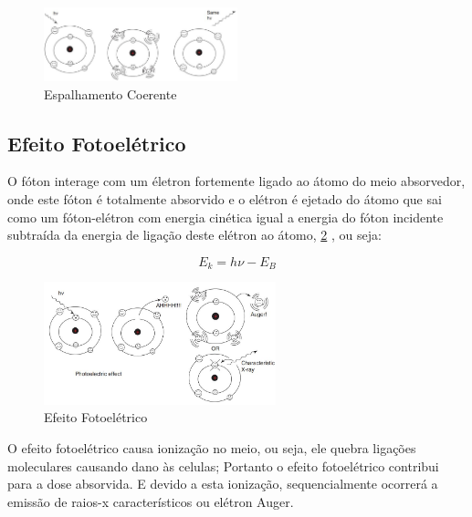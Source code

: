 \documentclass[11pt,a4paper]{article}
\begin{document}
            \begin{figure}[h]
                \centering
                \includegraphics[width=0.5\textwidth]{Imagens/espalhamentoCoerente.JPG}
                \caption{Espalhamento Coerente}
                \label{fig:espalhamentoCoerente}
            \end{figure}

\subsection*{Efeito Fotoelétrico}

    O fóton interage com um életron fortemente ligado ao átomo do meio absorvedor, onde este fóton é totalmente absorvido e o elétron é ejetado do átomo que sai como um fóton-elétron com energia cinética igual a energia do fóton incidente subtraída da energia de ligação deste elétron ao átomo, \ref{fig:efeitoFotoeletrico} , ou seja:



                \begin{equation}
                    E_k = h\nu - E_B
                \end{equation}

                \begin{figure}[h]
                    \centering
                    \includegraphics[width=0.6\textwidth]{Imagens/efeitoFotoeletrico.JPG}
                    \caption{Efeito Fotoelétrico}
                    \label{fig:efeitoFotoeletrico}
                \end{figure}

    O efeito fotoelétrico causa ionização no meio, ou seja, ele quebra ligações moleculares causando dano às celulas; Portanto o efeito fotoelétrico contribui para a dose absorvida. E devido a esta ionização, sequencialmente ocorrerá a emissão de raios-x característicos ou elétron Auger.
\end{document}
